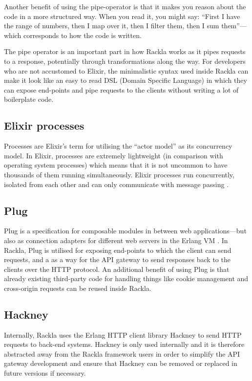 \documentclass{cslthse-msc}
\begin{document}
Another benefit of using the pipe-operator is that it makes you reason about the code in a more structured way. When you read it, you might say: \enquote{First I have the range of numbers, then I map over it, then I filter them, then I sum them}---which corresponds to how the code is written.

The pipe operator is an important part in how Rackla works as it pipes requests to a response, potentially through transformations along the way. For developers who are not accustomed to Elixir, the minimalistic syntax used inside Rackla can make it look like an easy to read DSL (Domain Specific Language) in which they can expose end-points and pipe requests to the clients without writing a lot of boilerplate code.

\subsection{Elixir processes}
Processes are Elixir's term for utilising the \enquote{actor model} as its concurrency model. In Elixir, processes are extremely lightweight (in comparison with operating system processes) which means that it is not uncommon to have thousands of them running simultaneously. Elixir processes run concurrently, isolated from each other and can only communicate with message passing \cite{elixir_processes}.

\subsection{Plug}
Plug is a specification for composable modules in between web applications---but also as connection adapters for different web servers in the Erlang VM \cite{plug}. In Rackla, Plug is utilised for exposing end-points to which the client can send requests, and a as a way for the API gateway to send responses back to the clients over the HTTP protocol. An additional benefit of using Plug is that already existing third-party code for handling things like cookie management and cross-origin requests can be reused inside Rackla.

\subsection{Hackney}
Internally, Rackla uses the Erlang HTTP client library Hackney \cite{hackney} to send HTTP requests to back-end systems. Hackney is only used internally and it is therefore abstracted away from the Rackla framework users in order to simplify the API gateway development and ensure that Hackney can be removed or replaced in future versions if necessary.
\end{document}
